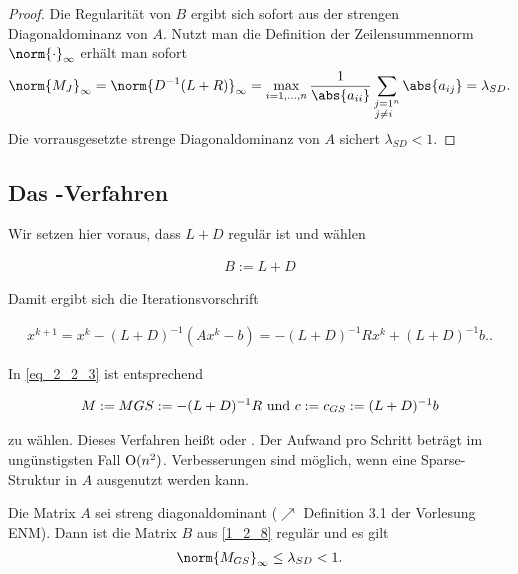 \begin{proof}
	Die Regularität von $B$ ergibt sich sofort aus der strengen Diagonaldominanz von $A$. Nutzt man die Definition der Zeilensummennorm $\norm{\cdot}_{\infty}$ erhält man sofort
	\begin{align}
		\norm{M_J}_{\infty} = \norm{D^{-1}(L+R)}_{\infty} =\max_{i = 1,\dots,n} \frac{1}{\abs{a_{ii}}} \sum_{\substack{j =1 \\ j\neq i}^{n}} \abs{a_{ij}}  = \lambda_{SD}.
	\end{align}
	Die vorrausgesetzte strenge Diagonaldominanz von $A$ sichert $\lambda_{SD} < 1$.
\end{proof}

\subsection{Das -Verfahren}
Wir setzen hier voraus, dass $L + D$ regulär ist und wählen

\begin{align}
	B := L + D \label{1_2_8}
\end{align}

Damit ergibt sich die Iterationsvorschrift

\begin{align}
	x^{k+1} = x^k - (L+D)^{-1}(Ax^k - b) = - (L+D)^{-1}R x^k + (L+D)^{-1}b. \label{1_2_9}.
\end{align}

In \eqref{eq_2_2_3} ist entsprechend

\begin{align}
	M:= M{GS} := - (L+D)^{-1}R \text{ und } c:= c_{GS} := (L+D)^{-1}b \notag
\end{align}

zu wählen. Dieses Verfahren heißt  oder . Der Aufwand pro Schritt beträgt im ungünstigsten Fall $\operatorname{O}(n^2)$. Verbesserungen sind möglich, wenn eine Sparse-Struktur in $A$ ausgenutzt werden kann.

\begin{proposition}
	Die Matrix $A$ sei streng diagonaldominant ($\nearrow$ Definition 3.1 der Vorlesung ENM). Dann ist die Matrix $B$ aus \eqref{1_2_8} regulär und es gilt
	\begin{align}
		\norm{M_{GS}}_{\infty} \le \lambda_{SD} <1.
	\end{align}
\end{proposition}

